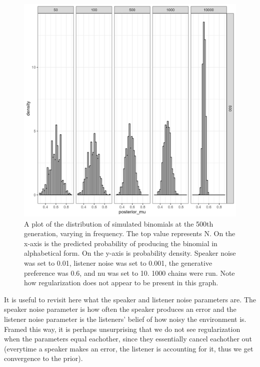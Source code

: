 \documentclass[
  jou,floatsintext]{apa6}
\begin{document}
\begin{figure}

{\centering \includegraphics[width=1\linewidth]{Figures/speaker_noise_01_listener_001} 

}

\caption{A plot of the distribution of simulated binomials at the 500th generation, varying in frequency. The top value represents N. On the x-axis is the predicted probability of producing the binomial in alphabetical form. On the y-axis is probability density. Speaker noise was set to 0.01, listener noise was set to 0.001, the generative preference was 0.6, and nu was set to 10. 1000 chains were run. Note how regularization does not appear to be present in this graph.}\label{fig:regularizationplot2}
\end{figure}

It is useful to revisit here what the speaker and listener noise parameters are. The speaker noise parameter is how often the speaker produces an error and the listener noise parameter is the listeners' belief of how noisy the environment is. Framed this way, it is perhaps unsurprising that we do not see regularization when the parameters equal eachother, since they essentially cancel eachother out (everytime a speaker makes an error, the listener is accounting for it, thus we get convergence to the prior).
\end{document}
